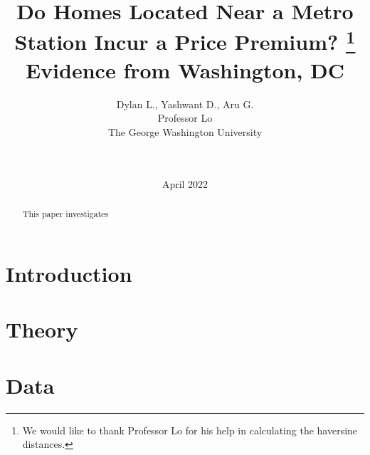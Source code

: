 \documentclass[12pt]{report}
\begin{document}
\title{%
Do Homes Located Near a Metro Station Incur a Price Premium? \thanks{{We would like to thank Professor Lo for his help in calculating the haversine distances.}} \\ 
\Large
Evidence from Washington, DC}
\author{Dylan L., Yashwant D., Aru G. \\ Professor Lo\\The George Washington University\\  \\  \\ }
\date{April 2022}

\maketitle


\bigskip
\bigskip
\bigskip
\bigskip
\bigskip
\bigskip
\bigskip
\bigskip


\begin{abstract}
\smallskip
This paper investigates 

\end{abstract}

\section*{Introduction}
\section*{Theory}


\section*{Data}
\end{document}
